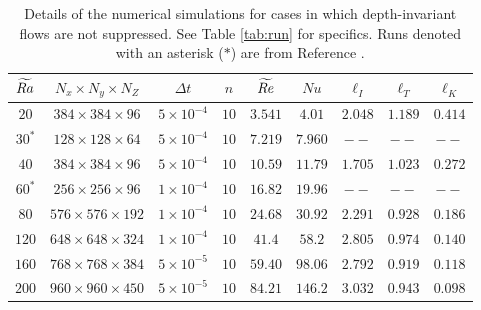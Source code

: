 \begin{table}
\begin{center}
\end{center}
\caption[Details of the numerical simulations for Chapter \ref{Oliver_2023} (without LSV)]{Details of the numerical simulations in which depth-invariant flows are suppressed. The number of physical space grid points in each respective direction is specified by $N_x\times N_y\times N_Z$, the time step size is denoted by $\Delta t$, and the horizontal domain size, as specified by the integer number of critical horizontal wavelengths, is denoted by $n$. The asymptotically rescaled Reynolds number is $\Ret$, $Nu$ is the Nusselt number, and the integral length scale, Taylor microscale and Kolmogorov scale are denoted by $\ell_I$, $\ell_T$ and $\ell_K$, respectively. All length scales are normalized by the critical wavelength $\lambda_{c} \approx 4.815$. }
	\label{tab:run}
\end{table}
\begin{table}
	\begin{center}
	\begin{tabular}{c c c c c c c c c}
		\hline
		\hline
		$\widetilde{Ra}$& $N_x\times N_y\times N_Z$ & $\Delta t$ & $n$ & $\Ret$ &  $Nu$ &$\ell_{I}$ & $\ell_{T}$ &$\ell_{K}$ \\
		\hline
$20$ & $384\times384\times96$ & $5\times 10^{-4}$ & $10$ & $3.541$ & $4.01$ & $2.048$ & $1.189$&$0.414$\\
$30^{*}$ & $128\times128\times64$ & $5\times 10^{-4}$ & $10$ & $7.219$ & $7.960$ & $--$ & $--$&$--$\\
$40$ & $384\times384\times96$ & $5\times 10^{-4}$ & $10$ & $10.59$ & $11.79$ & $1.705$ & $1.023$&$0.272$\\
$60^{*}$ & $256\times256\times96$ & $1\times 10^{-4}$ & $10$ & $16.82$ & $19.96$ & $--$ & $--$&$--$\\
$80$ & $576\times576\times192$ & $1\times 10^{-4}$ & $10$ & $24.68$ & $30.92$ & $2.291$ & $0.928$&$0.186$\\
$120$ & $648\times648\times324$ & $1\times 10^{-4}$ & $10$ & $41.4$ & $58.2$ & $2.805$ & $0.974$&$0.140$\\
$160$ & $768\times768\times384$ & $5\times 10^{-5}$ & $10$ & $59.40$ & $98.06$ & $2.792$ & $0.919$&$0.118$\\
$200$ & $960\times960\times450$ & $5\times 10^{-5}$ & $10$ & $84.21$ & $146.2$ & $3.032$ & $0.943$&$0.098$\\
		\hline
		\hline

	\end{tabular}
\end{center}
\caption[Details of the numerical simulations for Chapter \ref{Oliver_2023} (with LSV)]{Details of the numerical simulations for cases in which depth-invariant flows are not suppressed. See Table \ref{tab:run} for specifics. Runs denoted with an asterisk ($*$) are from Reference \citep{sM21}.}
\end{table}


